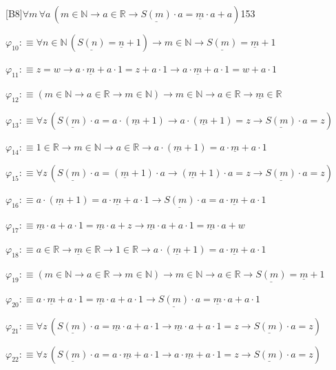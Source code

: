 \begin{fullproof}{[B8]}{$\forall m\,\forall a\,(m \in \mathbb{N} \to a \in \mathbb{R} \to \underline{S(m)} \cdot a = \underline{m} \cdot a + a)$}{153}
\begin{abbrevlist}
\item $\varphi_{10} :\equiv \forall n \in \mathbb{N}\,(\underline{S(n)} = \underline{n} + 1) \to m \in \mathbb{N} \to \underline{S(m)} = \underline{m} + 1$
\item $\varphi_{11} :\equiv z = w \to a \cdot \underline{m} + a \cdot 1 = z + a \cdot 1 \to a \cdot \underline{m} + a \cdot 1 = w + a \cdot 1$
\item $\varphi_{12} :\equiv (m \in \mathbb{N} \to a \in \mathbb{R} \to m \in \mathbb{N}) \to m \in \mathbb{N} \to a \in \mathbb{R} \to \underline{m} \in \mathbb{R}$
\item $\varphi_{13} :\equiv \forall z\,(\underline{S(m)} \cdot a = a \cdot (\underline{m} + 1) \to a \cdot (\underline{m} + 1) = z \to \underline{S(m)} \cdot a = z)$
\item $\varphi_{14} :\equiv 1 \in \mathbb{R} \to m \in \mathbb{N} \to a \in \mathbb{R} \to a \cdot (\underline{m} + 1) = a \cdot \underline{m} + a \cdot 1$
\item $\varphi_{15} :\equiv \forall z\,(\underline{S(m)} \cdot a = (\underline{m} + 1) \cdot a \to (\underline{m} + 1) \cdot a = z \to \underline{S(m)} \cdot a = z)$
\item $\varphi_{16} :\equiv a \cdot (\underline{m} + 1) = a \cdot \underline{m} + a \cdot 1 \to \underline{S(m)} \cdot a = a \cdot \underline{m} + a \cdot 1$
\item $\varphi_{17} :\equiv \underline{m} \cdot a + a \cdot 1 = \underline{m} \cdot a + z \to \underline{m} \cdot a + a \cdot 1 = \underline{m} \cdot a + w$
\item $\varphi_{18} :\equiv a \in \mathbb{R} \to \underline{m} \in \mathbb{R} \to 1 \in \mathbb{R} \to a \cdot (\underline{m} + 1) = a \cdot \underline{m} + a \cdot 1$
\item $\varphi_{19} :\equiv (m \in \mathbb{N} \to a \in \mathbb{R} \to m \in \mathbb{N}) \to m \in \mathbb{N} \to a \in \mathbb{R} \to \underline{S(m)} = \underline{m} + 1$
\item $\varphi_{20} :\equiv a \cdot \underline{m} + a \cdot 1 = \underline{m} \cdot a + a \cdot 1 \to \underline{S(m)} \cdot a = \underline{m} \cdot a + a \cdot 1$
\item $\varphi_{21} :\equiv \forall z\,(\underline{S(m)} \cdot a = \underline{m} \cdot a + a \cdot 1 \to \underline{m} \cdot a + a \cdot 1 = z \to \underline{S(m)} \cdot a = z)$
\item $\varphi_{22} :\equiv \forall z\,(\underline{S(m)} \cdot a = a \cdot \underline{m} + a \cdot 1 \to a \cdot \underline{m} + a \cdot 1 = z \to \underline{S(m)} \cdot a = z)$

\end{abbrevlist}
\end{fullproof}
